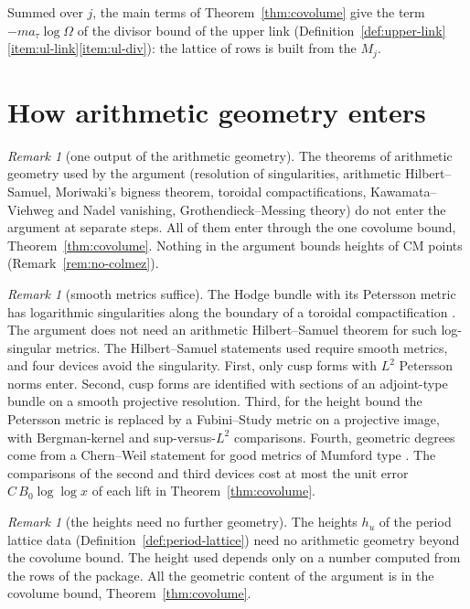 \documentclass[11pt]{amsbook}
\theoremstyle{plain}
\theoremstyle{definition}
\theoremstyle{remark}
\newtheorem{remark}[theorem]{Remark}
\numberwithin{equation}{section}
\numberwithin{figure}{chapter}
\numberwithin{table}{chapter}
\begin{document}
\noindent Summed over $j$, the main terms of
Theorem~\ref{thm:covolume} give the term $-ma_\tau\log\Omega$ of the
divisor bound of the upper link
(Definition~\ref{def:upper-link}\ref{item:ul-link}\ref{item:ul-div}):
the lattice of rows is built from the $M_j$.
\begin{figure}[tbp]
\centering

\end{figure}

\section{How arithmetic geometry enters}

\begin{remark}[one output of the arithmetic geometry]
\label{rem:covol-supply}
The theorems of arithmetic geometry used by the argument (resolution
of singularities, arithmetic Hilbert--Samuel, Moriwaki's bigness
theorem, toroidal compactifications, Kawamata--Viehweg and Nadel
vanishing, Grothendieck--Messing theory) do not enter the argument at
separate steps. All of them enter through the one covolume bound,
Theorem~\ref{thm:covolume}.
Nothing in the argument bounds heights of CM points
(Remark~\ref{rem:no-colmez}).
\end{remark}

\begin{remark}[smooth metrics suffice]\label{rem:smooth-metrics}
The Hodge bundle with its Petersson metric has logarithmic
singularities along the boundary of a toroidal compactification
\cite{BurgosKramerKuhn2005}. The argument does not need an arithmetic
Hilbert--Samuel theorem for such log-singular metrics. The
Hilbert--Samuel statements used require smooth metrics, and four
devices avoid the singularity. First, only
cusp forms with $L^2$ Petersson norms enter. Second, cusp forms are
identified with sections of an adjoint-type bundle on a smooth
projective resolution. Third, for the height bound the Petersson
metric is replaced by a Fubini--Study metric on a projective image,
with Bergman-kernel and sup-versus-$L^2$ comparisons. Fourth,
geometric degrees come from a Chern--Weil statement for good metrics
of Mumford type \cite{Mumford1977}. The comparisons of the second and
third devices cost at most the unit error $C\,B_0\log\log x$ of each
lift in Theorem~\ref{thm:covolume}.
\end{remark}

\begin{remark}[the heights need no further geometry]\label{rem:one-point}
The heights $h_u$ of the period lattice data
(Definition~\ref{def:period-lattice}) need no arithmetic geometry
beyond the covolume bound. The height used depends only on a number
computed from the rows of the package. All the geometric content of
the argument is in the covolume bound,
Theorem~\ref{thm:covolume}.
\end{remark}
\end{document}
